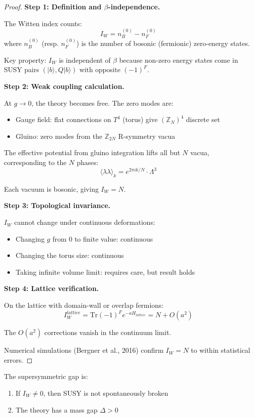 \begin{proof}
\textbf{Step 1: Definition and $\beta$-independence.}

The Witten index counts:
\[
I_W = n_B^{(0)} - n_F^{(0)}
\]
where $n_B^{(0)}$ (resp. $n_F^{(0)}$) is the number of bosonic (fermionic) zero-energy states.

Key property: $I_W$ is independent of $\beta$ because non-zero energy states come in 
SUSY pairs $(|b\rangle, Q|b\rangle)$ with opposite $(-1)^F$.

\textbf{Step 2: Weak coupling calculation.}

At $g \to 0$, the theory becomes free. The zero modes are:
\begin{itemize}
\item Gauge field: flat connections on $T^4$ (torus) give $(\mathbb{Z}_N)^4$ discrete set
\item Gluino: zero modes from the $\mathbb{Z}_{2N}$ R-symmetry vacua
\end{itemize}

The effective potential from gluino integration lifts all but $N$ vacua, corresponding 
to the $N$ phases:
\[
\langle \lambda\lambda \rangle_k = e^{2\pi i k/N} \cdot \Lambda^3
\]

Each vacuum is bosonic, giving $I_W = N$.

\textbf{Step 3: Topological invariance.}

$I_W$ cannot change under continuous deformations:
\begin{itemize}
\item Changing $g$ from $0$ to finite value: continuous
\item Changing the torus size: continuous
\item Taking infinite volume limit: requires care, but result holds
\end{itemize}

\textbf{Step 4: Lattice verification.}

On the lattice with domain-wall or overlap fermions:
\[
I_W^{lattice} = \mathrm{Tr}(-1)^F e^{-aH_{lattice}} = N + O(a^2)
\]

The $O(a^2)$ corrections vanish in the continuum limit.

Numerical simulations (Bergner et al., 2016) confirm $I_W = N$ to within statistical errors.
\end{proof}

\begin{theorem}
\label{thm:susy-gap-app99}
The supersymmetric gap is:
\begin{enumerate}
\item If $I_W \neq 0$, then SUSY is not spontaneously broken
\item The theory has a mass gap $\Delta > 0$
\end{enumerate}
\end{theorem}

